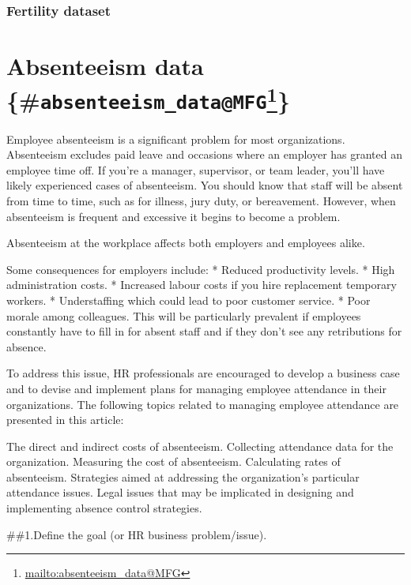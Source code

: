 \documentclass[12pt, krantz2,]{krantz}
\renewcommand{\href}[2]{#2\footnote{\url{#1}}}
\begin{document}
\hypertarget{fertility-dataset}{%
\subsection{Fertility dataset}\label{fertility-dataset}}

\hypertarget{absenteeism-data-absenteeism_datamfg}{%
\chapter{\texorpdfstring{Absenteeism data \{\#\href{mailto:absenteeism_data@MFG}{\nolinkurl{absenteeism\_data@MFG}}\}}{Absenteeism data \{\#absenteeism\_data@MFG\}}}\label{absenteeism-data-absenteeism_datamfg}}

Employee absenteeism is a significant problem for most organizations. Absenteeism excludes paid leave and occasions where an employer has granted an employee time off.
If you're a manager, supervisor, or team leader, you'll have likely experienced cases of absenteeism. You should know that staff will be absent from time to time, such as for illness, jury duty, or bereavement. However, when absenteeism is frequent and excessive it begins to become a problem.

Absenteeism at the workplace affects both employers and employees alike.

Some consequences for employers include:
* Reduced productivity levels.
* High administration costs.
* Increased labour costs if you hire replacement temporary workers.
* Understaffing which could lead to poor customer service.
* Poor morale among colleagues. This will be particularly prevalent if employees constantly have to fill in for absent staff and if they don't see any retributions for absence.

To address this issue, HR professionals are encouraged to develop a business case and to devise and implement plans for managing employee attendance in their organizations. The following topics related to managing employee attendance are presented in this article:

The direct and indirect costs of absenteeism.
Collecting attendance data for the organization.
Measuring the cost of absenteeism.
Calculating rates of absenteeism.
Strategies aimed at addressing the organization's particular attendance issues.
Legal issues that may be implicated in designing and implementing absence control strategies.

\#\#1.Define the goal (or HR business problem/issue).
\end{document}
